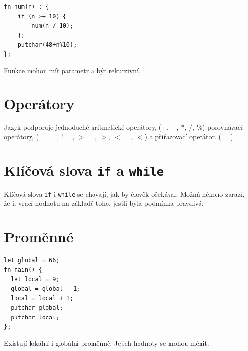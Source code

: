 \documentclass[12pt, a4paper, titlepage, abstract=on]{scrreprt}
\begin{document}
\begin{center}
\begin{minipage}{0.4\linewidth}
\begin{verbatim}
fn num(n) : {
    if (n >= 10) {
        num(n / 10);
    };
    putchar(48+n%10);
};
\end{verbatim}
\end{minipage}
\begin{minipage}{0.5\linewidth}
Funkce mohou mít parametr a být rekurzivní.
\end{minipage}
\end{center}
\vspace{1em}
\section{Operátory}
\vspace{1em}
Jazyk podporuje jednoduché aritmetické operátory, ($+,\ -,\ *,\ /,\ \%$) porovnávací operátory, ($==,\ !=,\ >=,\ >,\ <=,\ <$) a přiřazovací operátor. ($=$)
\section{Klíčová slova \texttt{if} a \texttt{while}}
\vspace{1em}
Klíčová slova \texttt{if} i \texttt{while} se chovají, jak by člověk očekával. Možná někoho zarazí, že if vrací hodnotu na základě toho, jestli byla podmínka
pravdivá.
\vspace{1em}
\section{Proměnné}
\vspace{1em}
\begin{center}
\begin{minipage}{0.4\linewidth}
\begin{verbatim}
let global = 66;
fn main() {
  let local = 9;
  global = global - 1;
  local = local + 1;
  putchar global;
  putchar local;
};
\end{verbatim}
\end{minipage}
\begin{minipage}{0.5\linewidth}
Existují lokální i globální proměnné. Jejich hodnoty se mohou měnit.
\end{minipage}
\end{center}
\end{document}
